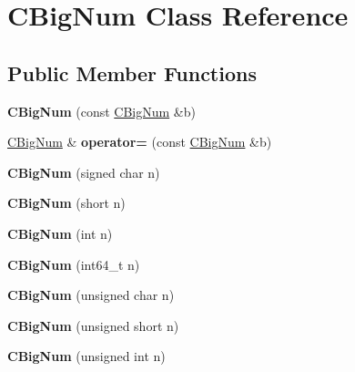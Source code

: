 \hypertarget{class_c_big_num}{}\section{C\+Big\+Num Class Reference}
\label{class_c_big_num}
\subsection*{Public Member Functions}
\begin{DoxyCompactItemize}
\item 
\mbox{\label{class_c_big_num_a50fcecb7d672c2b7d0a89e641a0682ca}} 
{\bfseries C\+Big\+Num} (const \mbox{\hyperlink{class_c_big_num}{C\+Big\+Num}} \&b)
\item 
\mbox{\label{class_c_big_num_a575e705d2120b0a43d74d798eaef48ee}} 
\mbox{\hyperlink{class_c_big_num}{C\+Big\+Num}} \& {\bfseries operator=} (const \mbox{\hyperlink{class_c_big_num}{C\+Big\+Num}} \&b)
\item 
\mbox{\label{class_c_big_num_a318644830d41471cd2bbcd702975bbb1}} 
{\bfseries C\+Big\+Num} (signed char n)
\item 
\mbox{\label{class_c_big_num_a0f4e34dcc48e9089e9f20c06418755c9}} 
{\bfseries C\+Big\+Num} (short n)
\item 
\mbox{\label{class_c_big_num_a930e53591ce24f650f7ddd1076bd4efe}} 
{\bfseries C\+Big\+Num} (int n)
\item 
\mbox{\label{class_c_big_num_acf7db72d557a485847c5ed99d6707bc0}} 
{\bfseries C\+Big\+Num} (int64\+\_\+t n)
\item 
\mbox{\label{class_c_big_num_afe63a4eb433e69687fad44193390dc1b}} 
{\bfseries C\+Big\+Num} (unsigned char n)
\item 
\mbox{\label{class_c_big_num_a3745ad1eb1bd53c9535f8620515d3ae3}} 
{\bfseries C\+Big\+Num} (unsigned short n)
\item 
\mbox{\label{class_c_big_num_a87ff912ff941f4bc4ba10482c502757d}} 
{\bfseries C\+Big\+Num} (unsigned int n)

\end{DoxyCompactItemize}
